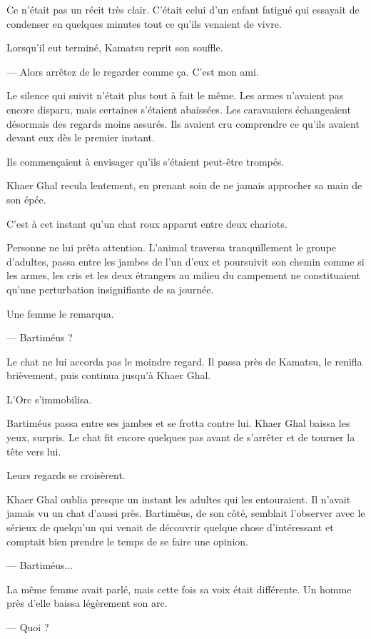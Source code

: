 Ce n'était pas un récit très clair. C'était celui d'un enfant fatigué qui
essayait de condenser en quelques minutes tout ce qu'ils venaient de vivre.

Lorsqu'il eut terminé, Kamatsu reprit son souffle.

— Alors arrêtez de le regarder comme ça. C'est mon ami.

Le silence qui suivit n'était plus tout à fait le même. Les armes n'avaient pas
encore disparu, mais certaines s'étaient abaissées. Les caravaniers
échangeaient désormais des regards moins assurés. Ils avaient cru comprendre
ce qu'ils avaient devant eux dès le premier instant.

Ils commençaient à envisager qu'ils s'étaient peut-être trompés.

Khaer Ghal recula lentement, en prenant soin de ne jamais approcher sa main de
son épée.

C'est à cet instant qu'un chat roux apparut entre deux chariots.

Personne ne lui prêta attention. L'animal traversa tranquillement le groupe
d'adultes, passa entre les jambes de l'un d'eux et poursuivit son chemin comme
si les armes, les cris et les deux étrangers au milieu du campement ne
constituaient qu'une perturbation insignifiante de sa journée.

Une femme le remarqua.

— Bartiméus ?

Le chat ne lui accorda pas le moindre regard. Il passa près de Kamatsu, le
renifla brièvement, puis continua jusqu'à Khaer Ghal.

L'Orc s'immobilisa.

Bartiméus passa entre ses jambes et se frotta contre lui. Khaer Ghal baissa
les yeux, surpris. Le chat fit encore quelques pas avant de s'arrêter et de
tourner la tête vers lui.

Leurs regards se croisèrent.

Khaer Ghal oublia presque un instant les adultes qui les entouraient. Il
n'avait jamais vu un chat d'aussi près. Bartiméus, de son côté, semblait
l'observer avec le sérieux de quelqu'un qui venait de découvrir quelque chose
d'intéressant et comptait bien prendre le temps de se faire une opinion.

— Bartiméus...

La même femme avait parlé, mais cette fois sa voix était différente. Un homme
près d'elle baissa légèrement son arc.

— Quoi ?

